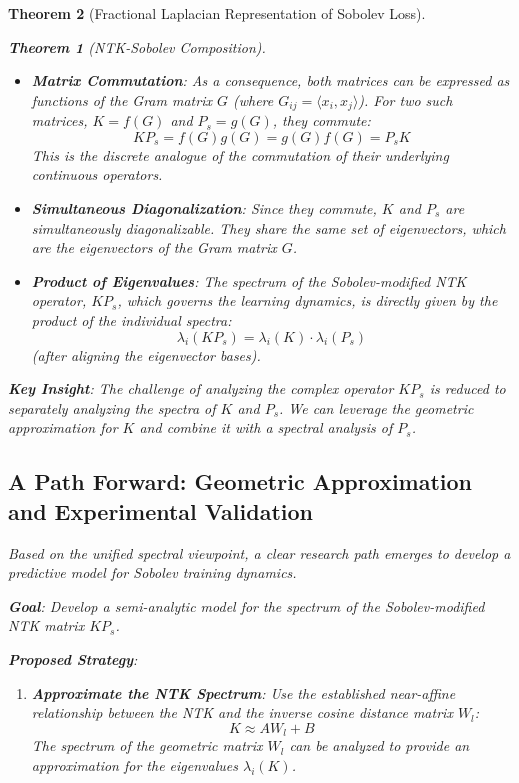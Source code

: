 \documentclass{article}
\newtheorem{theorem}{Theorem}[section]
\begin{document}
\begin{theorem}[Fractional Laplacian Representation of Sobolev Loss]
\begin{theorem}[NTK-Sobolev Composition]
\begin{itemize}
    \item \textbf{Matrix Commutation}: As a consequence, both matrices can be expressed as functions of the Gram matrix $G$ (where $G_{ij} = \langle x_i, x_j \rangle$). For two such matrices, $K=f(G)$ and $P_s=g(G)$, they commute:
    \[ K P_s = f(G)g(G) = g(G)f(G) = P_s K \]
    This is the discrete analogue of the commutation of their underlying continuous operators.
    
    \item \textbf{Simultaneous Diagonalization}: Since they commute, $K$ and $P_s$ are simultaneously diagonalizable. They share the same set of eigenvectors, which are the eigenvectors of the Gram matrix $G$.
    
    \item \textbf{Product of Eigenvalues}: The spectrum of the Sobolev-modified NTK operator, $K P_s$, which governs the learning dynamics, is directly given by the product of the individual spectra:
    \[ \lambda_i(K P_s) = \lambda_i(K) \cdot \lambda_i(P_s) \]
    (after aligning the eigenvector bases).
\end{itemize}

\textbf{Key Insight}: The challenge of analyzing the complex operator $K P_s$ is reduced to separately analyzing the spectra of $K$ and $P_s$. We can leverage the geometric approximation for $K$ and combine it with a spectral analysis of $P_s$.

\subsection{A Path Forward: Geometric Approximation and Experimental Validation}

Based on the unified spectral viewpoint, a clear research path emerges to develop a predictive model for Sobolev training dynamics.

\textbf{Goal}: Develop a semi-analytic model for the spectrum of the Sobolev-modified NTK matrix $K P_s$.

\textbf{Proposed Strategy}:

\begin{enumerate}
    \item \textbf{Approximate the NTK Spectrum}:
    Use the established near-affine relationship between the NTK and the inverse cosine distance matrix $W_l$:
    \[ K \approx A W_l + B \]
    The spectrum of the geometric matrix $W_l$ can be analyzed to provide an approximation for the eigenvalues $\lambda_i(K)$.


\end{enumerate}
\end{theorem}
\end{theorem}
\end{document}
